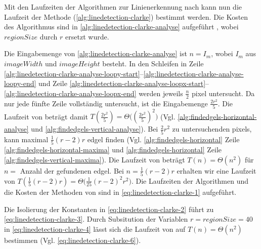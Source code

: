 Mit den Laufzeiten der Algorithmen zur Linienerkennung nach \citeauthor{clarke96} kann nun die Laufzeit der Methode
  (\autoref{alg:linedetection-clarke}) bestimmt werden. Die Kosten des Algorithmus sind in \autoref{alg:linedetection-clarke-analyse} aufgeführt , wobei $\mathit{regionSize}$ durch $r$ ersetzt wurde.

Die Eingabemenge von \autoref{alg:linedetection-clarke-analyse} ist $n = I_m$, wobei $I_m$ aus $\mathit{imageWidth}$
 und $\mathit{imageHeight}$ besteht. In den Schleifen in Zeile
 \ref{alg:linedetection-clarke-analyse-loopy-start}--\ref{alg:linedetection-clarke-analyse-loopy-end} und Zeile
 \ref{alg:linedetection-clarke-analyse-loopx-start}--\ref{alg:linedetection-clarke-analyse-loopx-end} werden jeweils
 $\tfrac{n}{2}$ \gls{pixel} untersucht. Da  nur jede fünfte Zeile vollständig untersucht, ist die
 Eingabemenge $\tfrac{2 r^2}{5}$. Die Laufzeit von  beträgt damit
 $T(\tfrac{2 r^2}{5}) = \Theta\bigl((\tfrac{2 r^2}{5})^2\bigr)$
 (Vgl. \autoref{alg:findedgels-horizontal-analyse} und \autoref{alg:findedgels-vertical-analyse}). Bei
 $\tfrac{2}{5}r^2$ zu untersuchenden \glspl{pixel}, kann  maximal $\tfrac{1}{5}(r - 2)r$
 \gls{edgel} finden (Vgl. \autoref{alg:findedgels-horizontal} Zeile \ref{alg:findedgels-horizontal-maxima} und
 \autoref{alg:findedgels-horizontal} Zeile \ref{alg:findedgels-vertical-maxima}). Die Laufzeit von
  beträgt $T(n) = \Theta(n^2)$ für $n = $ Anzahl der gefundenen \gls{edgel}. Bei
 $n = \tfrac{1}{5}(r - 2)r$ erhalten wir eine Laufzeit von
 $T(\tfrac{1}{5}(r - 2)r) = \Theta\bigl(\tfrac{1}{25}(r - 2)^2 r^2\bigr)$. Die Laufzeiten der Algorithmen und die Kosten
 der Methoden von  sind in \autoref{eq:linedetection-clarke-1} aufgeführt.

Die Isolierung der Konstanten in \autoref{eq:linedetection-clarke-2} führt zu \autoref{eq:linedetection-clarke-3}.
 Durch Subsitution der Variablen $r = \mathit{regionSize} = 40$ in \autoref{eq:linedetection-clarke-4} lässt sich die
 Laufzeit von  auf $T(n) = \Theta(n^2)$ bestimmen (Vgl. \autoref{eq:linedetection-clarke-6}).

